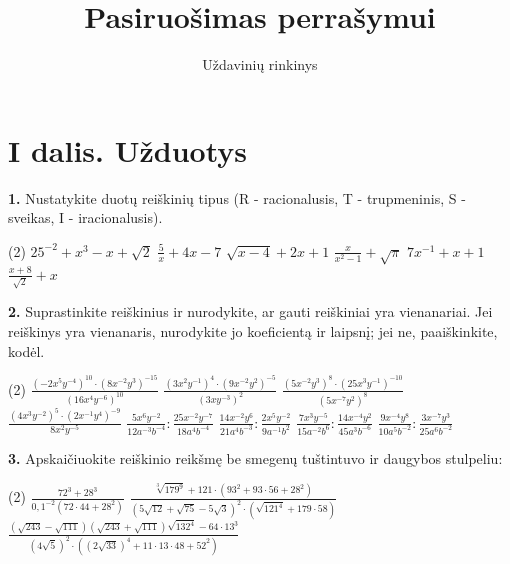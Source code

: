 \documentclass[11pt, a4paper]{article}
\title{\textbf{Pasiruošimas perrašymui}}
\author{Uždavinių rinkinys}
\date{}
\begin{document}
\maketitle

\section*{I dalis. Užduotys}

\textbf{1.} Nustatykite duotų reiškinių tipus (R - racionalusis, T - trupmeninis, S - sveikas, I - iracionalusis).
\begin{tasks}(2)
    \task \(25 ^{-2}+ x ^{3} -x+ \sqrt{2}\)
    \task $ \frac{5}{x}+4x-7 $
    \task \(\sqrt{x-4}+2x+1\)
    \task \(\frac{x}{x^2-1}+ \sqrt{\pi}\)
    \task \(7x^{-1}+x+1\)
    \task \(\frac{x+8}{ \sqrt{2} } +x\)
\end{tasks}

\vspace{0.5cm}
\textbf{2.} Suprastinkite reiškinius ir nurodykite, ar gauti reiškiniai yra vienanariai. Jei reiškinys yra vienanaris, nurodykite jo koeficientą ir laipsnį; jei ne, paaiškinkite, kodėl.
\begin{tasks}(2)
    \task \(\displaystyle \frac{(-2x^5y^{-4})^{10} \cdot (8x^{-2}y^3)^{-15}}{(16x^4y^{-6})^{10}}\)
    \task \(\displaystyle \frac{(3x^2y^{-1})^4 \cdot (9x^{-2}y^2)^{-5}}{(3xy^{-3})^2}\)
    \task \(\displaystyle \frac{(5x^{-2}y^3)^8 \cdot (25x^3y^{-1})^{-10}}{(5x^{-7}y^2)^8}\)
    \task \(\displaystyle \frac{(4x^3y^{-2})^5 \cdot (2x^{-1}y^4)^{-9}}{8x^2y^{-5}}\)
    \task \(\displaystyle \frac{5x^6y^{-2}}{12a^{-3}b^{-4}} : \frac{25x^{-2}y^{-7}}{18a^4b^{-4}}\)
    \task \(\displaystyle \frac{14x^{-2}y^6}{21a^4b^{-3}} : \frac{2x^5y^{-2}}{9a^{-1}b^2}\)
    \task \(\displaystyle \frac{7x^3y^{-5}}{15a^{-2}b^6} : \frac{14x^{-4}y^2}{45a^3b^{-6}}\)
    \task \(\displaystyle \frac{9x^{-4}y^8}{10a^5b^{-2}} : \frac{3x^{-7}y^3}{25a^6b^{-2}}\)
\end{tasks}

\vspace{0.5cm}
\textbf{3.} Apskaičiuokite reiškinio reikšmę be smegenų tuštintuvo ir daugybos stulpeliu:
\begin{tasks}(2)
    \task \(\displaystyle \frac{72^3 + 28^3}{0,1^{-2}(72 \cdot 44 + 28^2)}\)
    \task \(\displaystyle \frac{\sqrt[3]{179^9}+121 \cdot\left(93^2+93 \cdot 56+28^2\right)}{(5 \sqrt{12}+\sqrt{75}-5 \sqrt{3})^2 \cdot\left(\sqrt{121^4}+179 \cdot 58\right)}\)
    \task \(\displaystyle \frac{(\sqrt{243}-\sqrt{111})(\sqrt{243}+\sqrt{111})\sqrt{132^4}-64 \cdot 13^3}{(4\sqrt{5})^2\cdot\left((2\sqrt{33})^4+11\cdot13\cdot48+52^2\right)}\)
\end{tasks}
\end{document}
